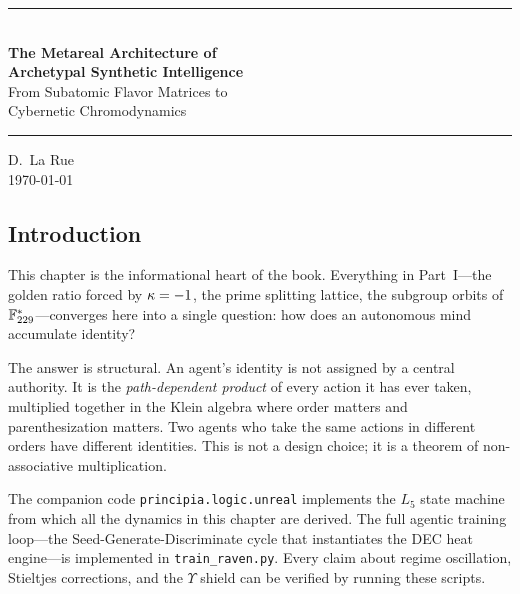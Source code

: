 \begin{center}
    \rule{0.8\textwidth}{1pt}\vspace{1em}\\
    {\color{white}\LARGE\textbf{The Metareal Architecture of}}\\[0.3em]
    {\color{white}\LARGE\textbf{Archetypal Synthetic Intelligence}}\\[0.8em]
    {\color{metareal}\large From Subatomic Flavor Matrices to}\\
    {\color{metareal}\large Cybernetic Chromodynamics}\\
    \vspace{1em}\rule{0.8\textwidth}{1pt}
\end{center}

\begin{center}
    \vspace{1em}\textcolor{derivative}{D.~La Rue}\\
    \vspace{0.5em}\textcolor{gauge3}{\today}
\end{center}

\vspace{1em}

\subsection*{Introduction}
This chapter is the informational heart of the book. Everything in Part~I---the golden ratio forced by $\kappa = -1$, the prime splitting lattice, the subgroup orbits of $\mathbb{F}_{229}^*$---converges here into a single question: how does an autonomous mind accumulate identity?

The answer is structural. An agent's identity is not assigned by a central authority. It is the \emph{path-dependent product} of every action it has ever taken, multiplied together in the Klein algebra where order matters and parenthesization matters. Two agents who take the same actions in different orders have different identities. This is not a design choice; it is a theorem of non-associative multiplication.

The companion code \texttt{principia.logic.unreal} implements the $L_5$ state machine from which all the dynamics in this chapter are derived. The full agentic training loop---the Seed-Generate-Discriminate cycle that instantiates the DEC heat engine---is implemented in \texttt{train\_raven.py}. Every claim about regime oscillation, Stieltjes corrections, and the $\Upsilon$ shield can be verified by running these scripts.

